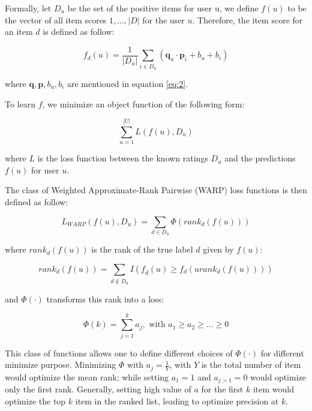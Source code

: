 \noindent Formally, let \(D_u\) be the set of the positive items for user u, we define \(f(u)\) to be the vector of all item scores \(1, \dots, \lvert D \rvert \) for the user \(u\). Therefore, the item score for an item \(d\) is defined as follow:

\begin{displaymath}
f_d(u) = \frac{1}{\lvert D_u \rvert} \sum_{i \in D_u} (\boldsymbol{q}_u \cdot \boldsymbol{p}_i + b_u + b_i) 
\end{displaymath}

\noindent where \(\boldsymbol{q}, \boldsymbol{p}, b_u, b_i\) are mentioned in equation \eqref{eq:2}. \hfill \break
 
\noindent To learn \(f\), we minimize an object function of the following form:

\begin{displaymath}
\sum_{u=1}^{\lvert U \rvert} L\left(f(u), D_u\right) \tag{3} \label{eq:3}
\end{displaymath}

\noindent where \(L\) is the loss function between the known ratings \(D_u\) and the predictions \(f(u)\) for user \(u\).  \hfill \break

\noindent The class of Weighted Approximate-Rank Pairwise (WARP) loss functions is then defined as follow:

\begin{displaymath}
L_{WARP}(f(u), D_u) = \sum_{d \in D_u} \Phi \left(rank_d(f(u))\right)   \tag{4} \label{eq:4}
\end{displaymath}

\noindent where \(rank_d(f(u))\) is the rank of the true label \(d\) given by \(f(u)\):

\begin{displaymath}
rank_d(f(u)) = \sum_{\bar{d} \notin D_u} I \left(f_{\bar{d}}(u) \geq f_d(urank_{d} \left(f\left( u \right)\right))\right)
\end{displaymath}

\noindent and \( \Phi (\cdot) \) transforms this rank into a loss:

\begin{displaymath}
\Phi(k) = \sum_{j=1}^k a_j, \text{ with } a_1 \geq a_2 \geq \ldots \geq 0
\end{displaymath}

\noindent This class of functions allows one to define different choices of \( \Phi(\cdot) \)  for different minimize purpose. Minimizing \( \Phi\) with \(a_j = \frac{1}{Y} \), with \(Y\) is the total number of item would optimize the mean rank; while setting \(a_1 = 1\) and \( a_{j>1} = 0 \) would optimize only the first rank. Generally,  setting high value of \(a\) for the first \(k\) item would optimize the top \(k\) item in the ranked list, leading to optimize precision at \(k\). 

